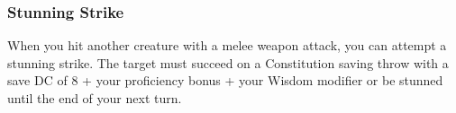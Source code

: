 \subsubsection{Stunning Strike} \label{mtec::stunningstrike}
When you hit another creature with a melee weapon attack, you can attempt a stunning strike.
The target must succeed on a Constitution saving throw with a save DC of 8 + your proficiency bonus + your Wisdom modifier or be stunned until the end of your next turn.
